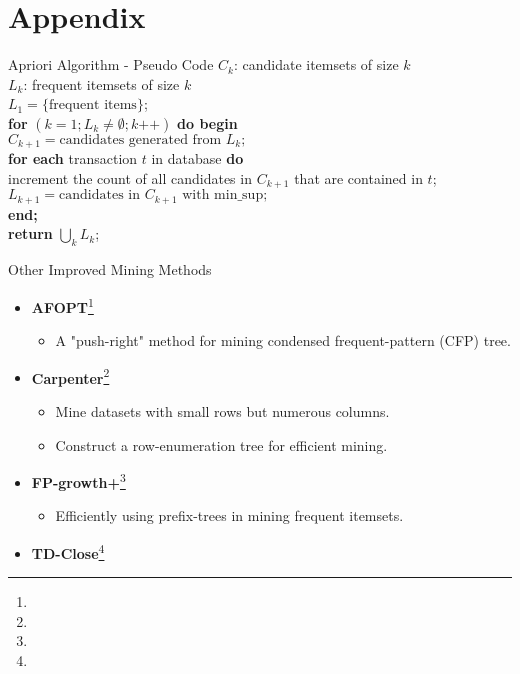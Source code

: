\section*{Appendix}

\begin{frame}{Apriori Algorithm - Pseudo Code}
	$C_k$: candidate itemsets of size $k$\\
	$L_k$: frequent itemsets of size $k$\\[0.5cm]

	$L_1 = \{\text{frequent items}\}$;\\[0.5cm]
	\textbf{for} $(k=1; L_k \neq \emptyset; k\texttt{++})$ \textbf{do begin}\\
	\hspace{1cm} $C_{k+1} = \text{candidates generated from } L_k;$\\
	\hspace{1cm} \textbf{for each} transaction $t$ in database \textbf{do}\\
	\hspace{2cm} increment the count of all candidates in $C_{k+1}$ that are
	contained in $t$;\\[0.1cm]
	\hspace{1cm}$L_{k+1} = \text{candidates in } C_{k+1} \text{ with
			min\_sup};$\\
	\textbf{end;}\\[0.1cm]
	\textbf{return} $\bigcup_k L_k$;
\end{frame}

\begin{frame}{Other Improved Mining Methods}
	\begin{itemize}
		\item \textbf{AFOPT}\footnote{}
		      \begin{itemize}
			      \item A "push-right" method for mining condensed frequent-pattern
			            (CFP) tree.
		      \end{itemize}
		\item \textbf{Carpenter}\footnote{}
		      \begin{itemize}
			      \item Mine datasets with small rows but numerous columns.
			      \item Construct a row-enumeration tree for efficient mining.
		      \end{itemize}
		\item \textbf{FP-growth+}\footnote{}
		      \begin{itemize}
			      \item Efficiently using prefix-trees in mining frequent itemsets.
		      \end{itemize}
		\item \textbf{TD-Close}\footnote{}
	\end{itemize}
\end{frame}

